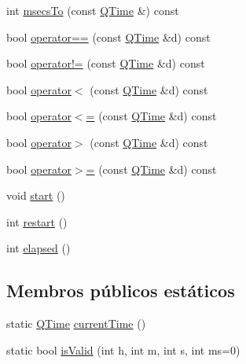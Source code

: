 \begin{DoxyCompactItemize}
\item 
int \hyperlink{class_q_time_abc2cd1b003dca3dac9fe5dbce564b0d3}{msecs\-To} (const \hyperlink{class_q_time}{Q\-Time} \&) const 
\item 
bool \hyperlink{class_q_time_acd84fe717c6c5c468467590c621a78e7}{operator==} (const \hyperlink{class_q_time}{Q\-Time} \&d) const 
\item 
bool \hyperlink{class_q_time_a9e949340215a28b1eaeb102f6dc1c077}{operator!=} (const \hyperlink{class_q_time}{Q\-Time} \&d) const 
\item 
bool \hyperlink{class_q_time_a86b36e8cdf4b5d69e2dcc8886d1dd02b}{operator$<$} (const \hyperlink{class_q_time}{Q\-Time} \&d) const 
\item 
bool \hyperlink{class_q_time_a4ed642bbe970377f484785042a1c644a}{operator$<$=} (const \hyperlink{class_q_time}{Q\-Time} \&d) const 
\item 
bool \hyperlink{class_q_time_af902d2f7fca5ebd8aa9a9d37ef74d4f2}{operator$>$} (const \hyperlink{class_q_time}{Q\-Time} \&d) const 
\item 
bool \hyperlink{class_q_time_ab37e449edbde9bc719287b3529c5913a}{operator$>$=} (const \hyperlink{class_q_time}{Q\-Time} \&d) const 
\item 
void \hyperlink{class_q_time_a60de64d75454385b23995437f1d72669}{start} ()
\item 
int \hyperlink{class_q_time_ae246359e104d63520158c26329caac80}{restart} ()
\item 
int \hyperlink{class_q_time_a85e7eae513a4620268e6d99e78f96065}{elapsed} ()
\end{DoxyCompactItemize}
\subsection*{Membros públicos estáticos}
\begin{DoxyCompactItemize}
\item 
static \hyperlink{class_q_time}{Q\-Time} \hyperlink{class_q_time_ab6a608d4dd52b3aa94cffe8548ff21d5}{current\-Time} ()
\item 
static bool \hyperlink{class_q_time_a0a59a7b72b9af1e403520972f2f4bf6e}{is\-Valid} (int h, int m, int s, int ms=0)
\end{DoxyCompactItemize}

